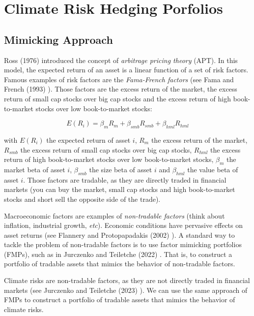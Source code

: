 \chapter{Climate Risk Hedging Porfolios}
 



\section{Mimicking Approach}


Ross (1976) \cite{ross1976apt} introduced 
the concept of \textit{arbitrage pricing theory} (APT).
In this model, the expected return of an asset is
a linear function of a set of risk factors. Famous examples of risk factors are the
\textit{Fama-French factors} (see Fama and French (1993) \cite{fama1993common}).
Those factors are the excess return of the market,
the excess return of small cap stocks over big cap stocks
and the excess return of high book-to-market stocks over low book-to-market stocks:

\begin{equation}
    E(R_i) = \beta_m R_m + \beta_{smb} R_{smb} + \beta_{hml} R_{hml}
\end{equation}

with $E(R_i)$ the expected return of asset $i$,
$R_m$ the excess return of the market, $R_{smb}$ the excess return of small cap stocks over big cap stocks,
$R_{hml}$ the excess return of high book-to-market stocks over low book-to-market stocks,
$\beta_m$ the market beta of asset $i$, $\beta_{smb}$ the size beta of asset $i$ and $\beta_{hml}$ the value beta of asset $i$.
Those factors are tradable, as 
they are directly traded in financial markets (you can buy 
the market, small cap stocks and high book-to-market stocks
and short sell the opposite side of the trade).

Macroeconomic factors are examples of 
\textit{non-tradable factors} (think about inflation, 
industrial growth, \textit{etc}). Economic conditions 
have pervasive effects on asset returns (see Flannery 
and Protopapadakis (2002) \cite{flannery2002macroeconomic}).
A standard way to tackle the problem of non-tradable factors
is to use factor mimicking portfolios (FMPs), such 
as in Jurczenko and Teiletche (2022) \cite{jurczenko2022macro}. That is,
to construct a portfolio of tradable assets that
mimics the behavior of non-tradable factors. 


Climate risks are non-tradable factors,
as they are not directly traded in financial markets
(see Jurczenko and Teiletche (2023) \cite{jurczenko2023climate}).
We can use the same approach of FMPs to construct
a portfolio of tradable assets that mimics the behavior
of climate risks.

